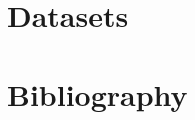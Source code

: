 \documentclass[11pt,letterpaper]{article}
\newcommand{\blue}[1]{\textcolor{RoyalBlue}{#1}}
\newcommand{\instructions}[1]{\blue{\textit{#1}}}
\renewcommand{\instructions}[1]{}
\begin{document}
\section*{Datasets} 
\instructions{Describe how you want to tackle this task}

\section*{Bibliography}
\instructions{If you need references for the background section, don't forget to create your own .bib file, and run {\tt bibtex}. If you call your bibliography {\tt mybib.bib} and put it in the same directory as this {\tt .tex} file, add {\tt$\backslash$bibliography\{mybib\}} before {\tt$\backslash$end\{document\}}
}
  
\end{document}
